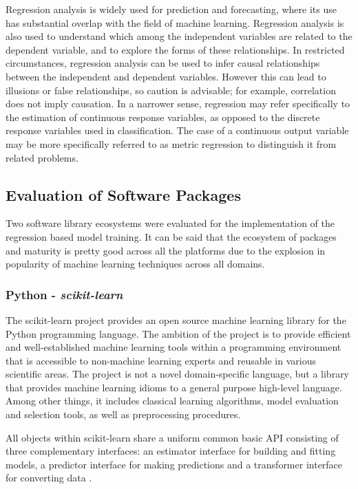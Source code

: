 \documentclass[letterpaper,12pt,titlepage,oneside,final]{report}
\begin{document}
        Regression analysis is widely used for prediction and forecasting, where its use has substantial overlap with the field of machine learning. Regression analysis is also used to understand which among the independent variables are related to the dependent variable, and to explore the forms of these relationships. In restricted circumstances, regression analysis can be used to infer causal relationships between the independent and dependent variables. However this can lead to illusions or false relationships, so caution is advisable; for example, correlation does not imply causation. In a narrower sense, regression may refer specifically to the estimation of continuous response variables, as opposed to the discrete response variables used in classification. The case of a continuous output variable may be more specifically referred to as metric regression to distinguish it from related problems.

        
        \subsection {Evaluation of Software Packages}
            Two software library ecosystems were evaluated for the implementation of the regression based model training. It can be said that the ecosystem of packages and maturity is pretty good across all the platforms due to the explosion in popularity of machine learning techniques across all domains.
            \subsubsection {Python - \textit{scikit-learn}}
                The scikit-learn project provides an open source machine learning library for the Python programming language. The ambition of the project is to provide efficient and well-established machine learning tools within a programming environment that is accessible to non-machine learning experts and reusable in various scientific areas. The project is not a novel domain-specific language, but a library that provides machine learning idioms to a general purpose high-level language. Among other things, it includes classical learning algorithms, model evaluation and selection tools, as well as preprocessing procedures.

                All objects within scikit-learn share a uniform common basic API consisting of three complementary interfaces: an estimator interface for building and fitting models, a predictor interface for making predictions and a transformer interface for converting data \cite{scikit-learn}.
\end{document}

